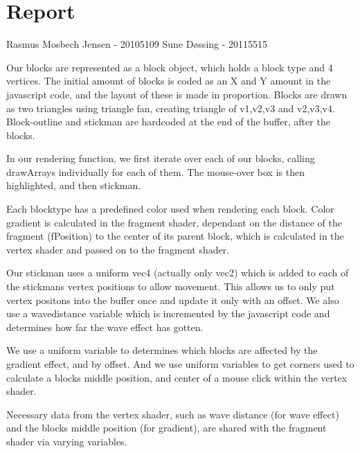 \section{Report}

Rasmus Mosbech Jensen - 20105109
Sune Døssing - 20115515



Our blocks are represented as a block object, which holds a block type and 4 vertices.
The initial amount of blocks is coded as an X and Y amount in the javascript code,
and the layout of these is made in proportion.
Blocks are drawn as two triangles using triangle fan, creating triangle of v1,v2,v3 and v2,v3,v4.
Block-outline and stickman are hardcoded at the end of the buffer, after the blocks.

In our rendering function, we first iterate over each of our blocks, calling drawArrays individually for each of them. The mouse-over box is then highlighted, and then stickman.


Each blocktype has a predefined color used when rendering each block.
Color gradient is calculated in the fragment shader, 
dependant on the distance of the fragment (fPosition) to the center of its parent block,
which is calculated in the vertex shader and passed on to the fragment shader.



Our stickman uses a uniform vec4 (actually only vec2) which is added to each of the stickmans vertex positions to allow movement.
This allows us to only put vertex positons into the buffer once and update it only with an offset. 
We also use a wavedistance variable which is incremented by the javascript code and determines how far the wave effect has gotten.

We use a uniform variable to determines which blocks are affected by the gradient effect, and by offset.
And we use uniform variables to get corners used to calculate a blocks middle position, and center of a mouse click within the vertex shader.

Necessary data from the vertex shader, 
such as wave distance (for wave effect) and the blocks middle position (for gradient), 
are shared with the fragment shader via varying variables.


